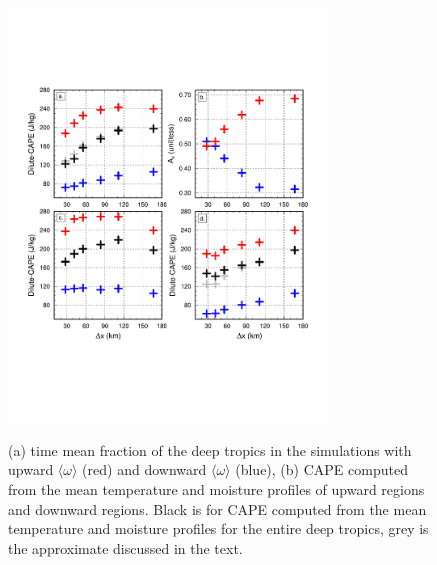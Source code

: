 \documentclass[times]{qjrms4}
\begin{document}
\begin{figure}
\begin{center}
\noindent\includegraphics[width=20pc,angle=0]{figs/temp_cape-ne20.pdf}\\
\end{center}
\caption{(a) time mean fraction of the deep tropics in the simulations with upward $\langle \omega \rangle$ (red) and downward $\langle \omega \rangle$ (blue), (b) CAPE computed from the mean temperature and moisture profiles of upward regions and downward regions. Black is for CAPE computed from the mean temperature and moisture profiles for the entire deep tropics, grey is the approximate discussed in the text.}
\label{fig:cape}
\end{figure}
\end{document}
